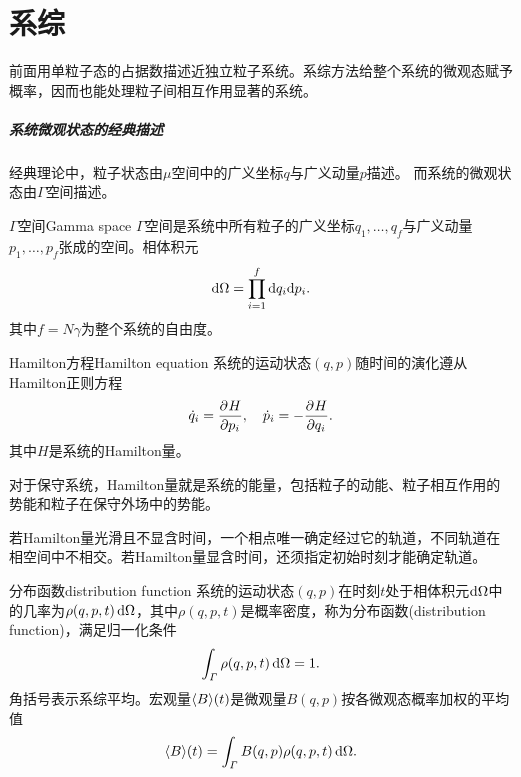 \chapter{系综}

前面用单粒子态的占据数描述近独立粒子系统。系综方法给整个系统的微观态赋予概率，因而也能处理粒子间相互作用显著的系统。

\paragraph{系统微观状态的经典描述}

经典理论中，粒子状态由$\mu$空间中的广义坐标$q$与广义动量$p$描述。
而系统的微观状态由$\varGamma$空间描述。

\begin{definition}{$\varGamma$空间}{Gamma space}
	$\varGamma$空间是系统中所有粒子的广义坐标$q_1,\ldots,q_f$与广义动量$p_1,\ldots,p_f$张成的空间。相体积元
	\begin{equation}
		\mathop{}\!\mathrm{d}\Omega = \prod_{i=1}^f\mathop{}\!\mathrm{d} q_i\mathrm{d} p_i.
	\end{equation}
	其中$f = N\gamma$为整个系统的自由度。
\end{definition}

\begin{theorem}
	{Hamilton方程}{Hamilton equation}
	系统的运动状态$(q,p)$随时间的演化遵从Hamilton正则方程
	\begin{equation}
		\dot q_i = \frac{\partial^{}H}{\partial{p_i}^{}},\quad \dot p_i = -\frac{\partial^{}H}{\partial{q_i}^{}}.
	\end{equation}
	其中$H$是系统的Hamilton量。
\end{theorem}

\begin{remark}
	对于保守系统，Hamilton量就是系统的能量，包括粒子的动能、粒子相互作用的势能和粒子在保守外场中的势能。
\end{remark}

\begin{corollary}
	若Hamilton量光滑且不显含时间，一个相点唯一确定经过它的轨道，不同轨道在相空间中不相交。若Hamilton量显含时间，还须指定初始时刻才能确定轨道。
\end{corollary}

\begin{definition}
	{分布函数}{distribution function}
	系统的运动状态$(q,p)$在时刻$t$处于相体积元$\mathop{}\!\mathrm{d}\Omega$中的几率为$\rho(q,p,t)\mathop{}\!\mathrm{d}\Omega$，其中$\rho(q,p,t)$是概率密度，称为分布函数(distribution function)，满足归一化条件
	\begin{equation}
		\label{eq:sm-phase-density-normalization}
		\int_\varGamma\rho(q,p,t)\mathop{}\!\mathrm{d}\Omega = 1.
	\end{equation}
	角括号表示系综平均。宏观量$\langle B\rangle(t)$是微观量$B(q,p)$按各微观态概率加权的平均值
	\begin{equation}
		\langle B\rangle(t) = \int_\varGamma B(q,p)\rho(q,p,t)\mathop{}\!\mathrm{d}\Omega.
	\end{equation}
\end{definition}

